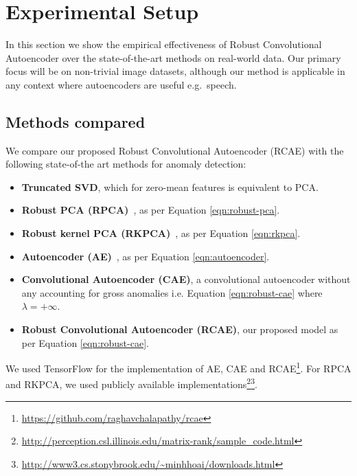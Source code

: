 \section{Experimental Setup}
\label{sec:unsup_experiment-setup}

In this section we show the empirical effectiveness of Robust Convolutional Autoencoder over the state-of-the-art methods on real-world data.
Our primary focus will be on non-trivial image datasets, although our method is applicable in any context where autoencoders are useful e.g.\ speech.

\subsection{Methods compared}
We compare our proposed Robust Convolutional Autoencoder (RCAE)
with the following  state-of-the art methods for anomaly detection:
\let\labelitemi\labelitemii
\begin{itemize}
	\item \textbf{Truncated SVD}, which for zero-mean features is equivalent to PCA. %

	\item \textbf{Robust PCA (RPCA)}~\cite{candes2010robust}, as per Equation \ref{eqn:robust-pca}.

	\item \textbf{Robust kernel PCA (RKPCA)}~\cite{Nguyen:2009}, as per Equation \ref{eqn:rkpca}.

   	\item \textbf{Autoencoder (AE)}~\cite{bengio2009learning}, as per Equation \ref{eqn:autoencoder}.

   	\item \textbf{Convolutional Autoencoder (CAE)}, a convolutional autoencoder without any accounting for gross anomalies i.e. Equation \ref{eqn:robust-cae} where $\lambda = +\infty$.

   	\item \textbf{Robust Convolutional Autoencoder (RCAE)}, our proposed model as per Equation \ref{eqn:robust-cae}.
\end{itemize}
We used TensorFlow \cite{abadi2016tensorflow} for the implementation of AE, CAE and RCAE\footnote{\url{https://github.com/raghavchalapathy/rcae}}.
For RPCA and RKPCA,
we used
publicly available implementations\footnote{\url{http://perception.csl.illinois.edu/matrix-rank/sample_code.html}}\footnote{\url{http://www3.cs.stonybrook.edu/~minhhoai/downloads.html}}.

